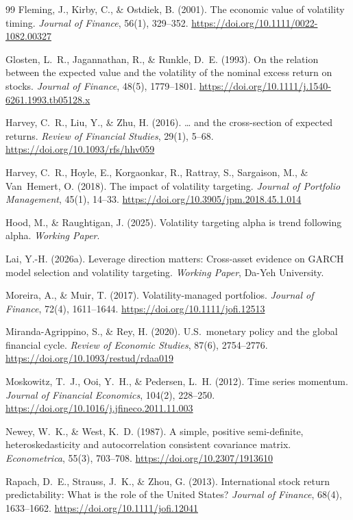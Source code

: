 \documentclass[12pt,a4paper]{article}
\begin{document}
\begin{thebibliography}{99}
Fleming, J., Kirby, C., \& Ostdiek, B. (2001). The economic value of volatility timing. \textit{Journal of Finance}, 56(1), 329--352. \url{https://doi.org/10.1111/0022-1082.00327}

Glosten, L.~R., Jagannathan, R., \& Runkle, D.~E. (1993). On the relation between the expected value and the volatility of the nominal excess return on stocks. \textit{Journal of Finance}, 48(5), 1779--1801. \url{https://doi.org/10.1111/j.1540-6261.1993.tb05128.x}

Harvey, C.~R., Liu, Y., \& Zhu, H. (2016). \ldots{} and the cross-section of expected returns. \textit{Review of Financial Studies}, 29(1), 5--68. \url{https://doi.org/10.1093/rfs/hhv059}

Harvey, C.~R., Hoyle, E., Korgaonkar, R., Rattray, S., Sargaison, M., \& Van~Hemert, O. (2018). The impact of volatility targeting. \textit{Journal of Portfolio Management}, 45(1), 14--33. \url{https://doi.org/10.3905/jpm.2018.45.1.014}

Hood, M., \& Raughtigan, J. (2025). Volatility targeting alpha is trend following alpha. \textit{Working Paper}.

Lai, Y.-H. (2026a). Leverage direction matters: Cross-asset evidence on GARCH model selection and volatility targeting. \textit{Working Paper}, Da-Yeh University.

Moreira, A., \& Muir, T. (2017). Volatility-managed portfolios. \textit{Journal of Finance}, 72(4), 1611--1644. \url{https://doi.org/10.1111/jofi.12513}

Miranda-Agrippino, S., \& Rey, H. (2020). U.S.\ monetary policy and the global financial cycle. \textit{Review of Economic Studies}, 87(6), 2754--2776. \url{https://doi.org/10.1093/restud/rdaa019}

Moskowitz, T.~J., Ooi, Y.~H., \& Pedersen, L.~H. (2012). Time series momentum. \textit{Journal of Financial Economics}, 104(2), 228--250. \url{https://doi.org/10.1016/j.jfineco.2011.11.003}

Newey, W.~K., \& West, K.~D. (1987). A simple, positive semi-definite, heteroskedasticity and autocorrelation consistent covariance matrix. \textit{Econometrica}, 55(3), 703--708. \url{https://doi.org/10.2307/1913610}

Rapach, D.~E., Strauss, J.~K., \& Zhou, G. (2013). International stock return predictability: What is the role of the United States? \textit{Journal of Finance}, 68(4), 1633--1662. \url{https://doi.org/10.1111/jofi.12041}

\end{thebibliography}
\end{document}
